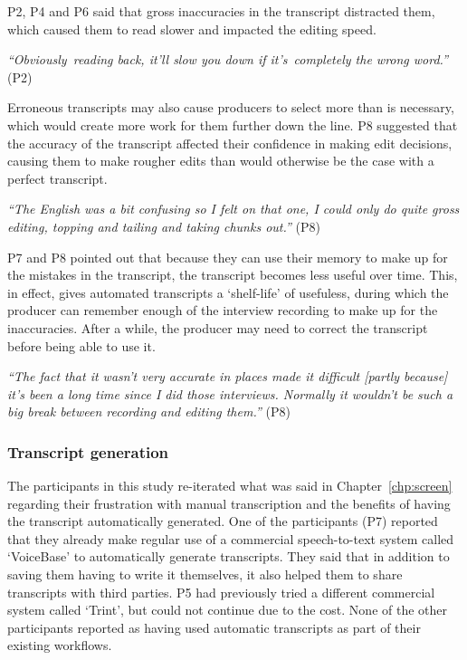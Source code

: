 P2, P4 and P6 said that gross inaccuracies in the transcript distracted them, which caused them to read slower and
impacted the editing speed.

\textit{``Obviously reading back, it'll slow you down if it's completely the wrong word.''} (P2)

Erroneous transcripts may also cause producers to select more than is necessary, which would create more work for them
further down the line. P8 suggested that the accuracy of the transcript affected their confidence in making edit
decisions, causing them to make rougher edits than would otherwise be the case with a perfect transcript.

\textit{``The English was a bit confusing so I felt on that one, I could only do quite gross editing, topping and
tailing and taking chunks out.''} (P8)

P7 and P8 pointed out that because they can use their memory to make up for the mistakes in the transcript,
the transcript becomes less useful over time. This, in effect, gives automated transcripts a `shelf-life' of usefuless,
during which the producer can remember enough of the interview recording to make up for the inaccuracies. After a
while, the producer may need to correct the transcript before being able to use it.

\textit{``The fact that it wasn't very accurate in places made it difficult [partly because] it's been a long time
since I did those interviews. Normally it wouldn't be such a big break between recording and editing them.''} (P8)

\subsubsection{Transcript generation}

The participants in this study re-iterated what was said in Chapter~\ref{chp:screen} regarding their frustration with
manual transcription and the benefits of having the transcript automatically generated.  One of the participants (P7)
reported that they already make regular use of a commercial speech-to-text system called `VoiceBase' to automatically
generate transcripts. They said that in addition to saving them having to write it themselves, it also helped them to
share transcripts with third parties. P5 had previously tried a different commercial system called `Trint', but could
not continue due to the cost. None of the other participants reported as having used automatic transcripts as part of
their existing workflows.

